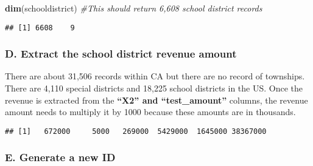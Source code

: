 \documentclass[]{article}
\newenvironment{Shaded}{\begin{snugshade}}{\end{snugshade}}
\newcommand{\KeywordTok}[1]{\textcolor[rgb]{0.13,0.29,0.53}{\textbf{#1}}}
\newcommand{\DataTypeTok}[1]{\textcolor[rgb]{0.13,0.29,0.53}{#1}}
\newcommand{\DecValTok}[1]{\textcolor[rgb]{0.00,0.00,0.81}{#1}}
\newcommand{\StringTok}[1]{\textcolor[rgb]{0.31,0.60,0.02}{#1}}
\newcommand{\CommentTok}[1]{\textcolor[rgb]{0.56,0.35,0.01}{\textit{#1}}}
\newcommand{\OperatorTok}[1]{\textcolor[rgb]{0.81,0.36,0.00}{\textbf{#1}}}
\newcommand{\NormalTok}[1]{#1}
\begin{document}
\begin{Shaded}
\begin{Highlighting}[]
  \KeywordTok{dim}\NormalTok{(schooldistrict) }\CommentTok{#This should return 6,608 school district records}
\end{Highlighting}
\end{Shaded}

\begin{verbatim}
## [1] 6608    9
\end{verbatim}

\subsubsection{D. Extract the school district revenue
amount}\label{d.-extract-the-school-district-revenue-amount}

There are about 31,506 records within CA but there are no record of
townships. There are 4,110 special districts and 18,225 school districts
in the US. Once the revenue is extracted from the \textbf{``X2'' and
``test\_amount''} columns, the revenue amount needs to multiply it by
1000 because these amounts are in thousands.

\begin{Shaded}
\end{Shaded}

\begin{verbatim}
## [1]   672000     5000   269000  5429000  1645000 38367000
\end{verbatim}

\subsubsection{E. Generate a new ID}\label{e.-generate-a-new-id}
\end{document}
